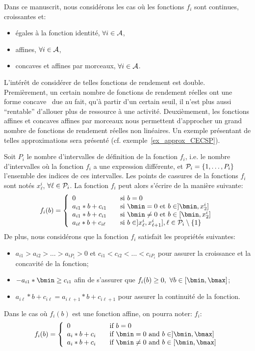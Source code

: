 Dans ce manuscrit, nous considérons les cas où les fonctions $f_i$
sont continues, croissantes et:
\begin{itemize}
\item égales à la fonction identité, $\forall i \in \A$,
\item affines, $\forall i \in \A$,
\item concaves et affines par morceaux, $\forall
  i \in \A$.
\end{itemize}

L'intérêt de considérer de telles fonctions de rendement est
double. Premièrement, un certain nombre de fonctions de rendement
réelles ont une forme concave~\cite{Ex1,Ex2} due au fait, qu'à partir
d'un certain seuil, il n'est plus aussi ``rentable'' d'allouer plus de
ressource à une activité. Deuxièmement, les fonctions affines et
concaves affines par morceaux nous permettent d'approcher un grand
nombre de fonctions de rendement réelles non linéaires. Un exemple
présentant de telles approximations sera présenté
(cf. exemple~\ref{ex_approx_CECSP}).

Soit $P_i$ le nombre d'intervalles de définition de la fonction $f_i$,
i.e. le nombre d'intervalles où la fonction $f_i$ a une expression
différente, et $\P_i=\{1,\dots,P_i\}$ l'ensemble des indices de ces
intervalles. Les points de cassures de la fonctions $f_i$ sont notés
$x_\ell^i$, $\forall \ell \in \P_i$. La fonction $f_i$ peut alors
s'écrire de la manière suivante: 
\[f_i(b)=\left\{
    \begin{array}{ll}
      0 & \quad \text{si }b=0\\
      a_{i1}*b+c_{i1} &\quad \text{si }\bmin=0\text{ et }b \in ]\bmin,x_{2}^i] \\
      a_{i1}*b+c_{i1} &\quad \text{si }\bmin\neq 0 \text{ et }b \in
                            [\bmin,x_{2}^i] \\
      a_{i\ell}*b+c_{i\ell} &\quad \text{si } b \in
                                  ]x_{\ell}^i,x_{\ell+1}^i], \ell \in \P_i\setminus\{1\}
    \end{array}
  \right.\]
De plus, nous considérons que la fonction $f_i$ satisfait les
propriétés suivantes: 
\begin{itemize}
\item $a_{i1} >a_{i2} > \dots > a_{iP_i}>0$ et $c_{i1}
  <c_{i2} < \dots < c_{iP_i}$ pour assurer la croissance et la
  concavité de la fonction; 
\item $-a_{i1}*\bmin \ge c_{i1}$  afin de s'assurer que $f_i(b) \ge
  0,\ \forall b \in [\bmin,\bmax]$;
\item $a_{i\ell}*b+c_{i\ell}=a_{i\ell+1}*b+c_{i\ell+1}$
  pour assurer la continuité de la fonction.
\end{itemize}
Dans le cas où $f_i(b)$ est une fonction affine, on pourra noter:
$f_i$:
\[f_i(b)=\left\{
\begin{array}{ll}
  0 & \quad \text{if }b=0\\
  a_i*b+c_i &\quad \text{if }\bmin=0\text{ and }b \in ]\bmin,\bmax] \\
  a_i*b+c_i &\quad \text{if }\bmin\neq 0 \text{ and }b \in [\bmin,\bmax]
\end{array}
\right.
\]



